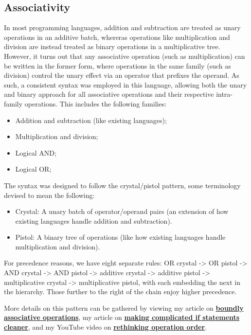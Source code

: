 \documentclass[12pt,a4paper,twoside]{report}
\begin{document}
\subsection{Associativity}

In most programming languages, addition and subtraction are treated as unary operations in an additive batch, whereras operations like multiplication and division are instead treated as binary operations in a multiplicative tree. However, it turns out that any associative operation (such as multiplication) can be written in the former form, where operations in the same family (such as division) control the unary effect via an operator that prefixes the operand. As such, a consistent syntax was employed in this language, allowing both the unary and binary approach for all associative operations and their respective intra-family operations. This includes the following families:

\begin{itemize}
  \item Addition and subtraction (like existing languages);
  \item Multiplication and division;
  \item Logical AND;
  \item Logical OR;
\end{itemize}

The syntax was designed to follow the crystal/pistol pattern, some terminology devised to mean the following:

\begin{itemize}
  \item Crystal: A unary batch of operator/operand pairs (an extension of how existing languages handle addition and subtraction).
  \item Pistol: A binary tree of operations (like how existing languages handle multiplication and division).
\end{itemize}

For precedence reasons, we have eight separate rules: OR crystal -> OR pistol -> AND crystal -> 
AND pistol -> additive crystal -> additive pistol -> multiplicative crystal -> multiplicative pistol, with each embedding the next in the hierarchy. Those further to the right of the chain enjoy higher precedence.

More details on this pattern can be gathered by viewing my article on \textbf{\href{https://medium.com/@davidcallanan/rethinking-operation-order-the-illusion-of-ambiguity-and-the-introduction-of-bound-pairs-ceef5242a941}{boundly associative operations}}, my article on \textbf{\href{https://medium.com/@davidcallanan/making-complicated-if-statements-cleaner-61bd1e2afeb8}{making complicated if statements cleaner}}, and my YouTube video on \textbf{\href{https://www.youtube.com/watch?v=C5VEKAc0quk}{rethinking operation order}}.
\end{document}
